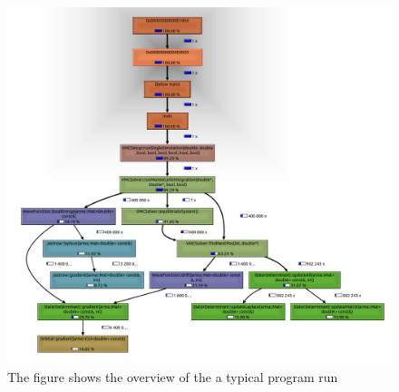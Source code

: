 \documentclass[aps,prc,twocolumn,floatfix]{revtex4}
\begin{document}
\begin{appendices}
\begin{widetext}
\begin{figure}
\centering
\includegraphics[width=17cm]{figures/programview.png}
\caption{\label{fig:12} The figure shows the overview of the a typical program run}
\end{figure}
\end{widetext}
 
 

\end{appendices}
\end{document}
